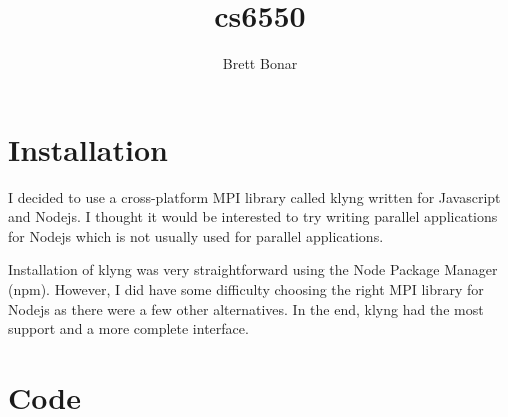 \documentclass{article}
\title{cs6550}
\author{ Brett Bonar }
\begin{document}
\maketitle

\section{Installation}
I decided to use a cross-platform MPI library called klyng written for Javascript and Nodejs. I thought it would be interested to try writing parallel applications for Nodejs which is not usually used for parallel applications.

Installation of klyng was very straightforward using the Node Package Manager (npm). However, I did have some difficulty choosing the right MPI library for Nodejs as there were a few other alternatives. In the end, klyng had the most support and a more complete interface.

\section{Code}

\end{document}
